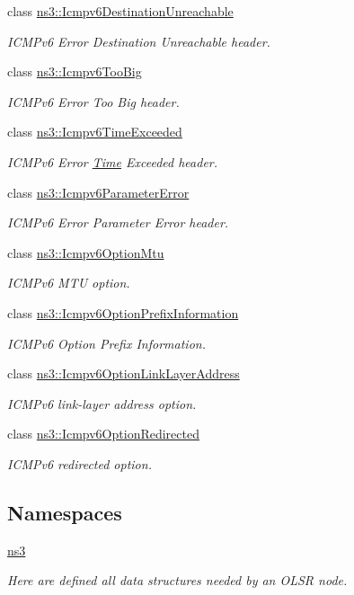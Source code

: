 \begin{DoxyCompactItemize}
class \hyperlink{classns3_1_1Icmpv6DestinationUnreachable}{ns3\+::\+Icmpv6\+Destination\+Unreachable}
\begin{DoxyCompactList}\small\item\em I\+C\+M\+Pv6 Error Destination Unreachable header. \end{DoxyCompactList}\item 
class \hyperlink{classns3_1_1Icmpv6TooBig}{ns3\+::\+Icmpv6\+Too\+Big}
\begin{DoxyCompactList}\small\item\em I\+C\+M\+Pv6 Error Too Big header. \end{DoxyCompactList}\item 
class \hyperlink{classns3_1_1Icmpv6TimeExceeded}{ns3\+::\+Icmpv6\+Time\+Exceeded}
\begin{DoxyCompactList}\small\item\em I\+C\+M\+Pv6 Error \hyperlink{classns3_1_1Time}{Time} Exceeded header. \end{DoxyCompactList}\item 
class \hyperlink{classns3_1_1Icmpv6ParameterError}{ns3\+::\+Icmpv6\+Parameter\+Error}
\begin{DoxyCompactList}\small\item\em I\+C\+M\+Pv6 Error Parameter Error header. \end{DoxyCompactList}\item 
class \hyperlink{classns3_1_1Icmpv6OptionMtu}{ns3\+::\+Icmpv6\+Option\+Mtu}
\begin{DoxyCompactList}\small\item\em I\+C\+M\+Pv6 M\+TU option. \end{DoxyCompactList}\item 
class \hyperlink{classns3_1_1Icmpv6OptionPrefixInformation}{ns3\+::\+Icmpv6\+Option\+Prefix\+Information}
\begin{DoxyCompactList}\small\item\em I\+C\+M\+Pv6 Option Prefix Information. \end{DoxyCompactList}\item 
class \hyperlink{classns3_1_1Icmpv6OptionLinkLayerAddress}{ns3\+::\+Icmpv6\+Option\+Link\+Layer\+Address}
\begin{DoxyCompactList}\small\item\em I\+C\+M\+Pv6 link-\/layer address option. \end{DoxyCompactList}\item 
class \hyperlink{classns3_1_1Icmpv6OptionRedirected}{ns3\+::\+Icmpv6\+Option\+Redirected}
\begin{DoxyCompactList}\small\item\em I\+C\+M\+Pv6 redirected option. \end{DoxyCompactList}\end{DoxyCompactItemize}
\subsection*{Namespaces}
\begin{DoxyCompactItemize}
\item 
 \hyperlink{namespacens3}{ns3}
\begin{DoxyCompactList}\small\item\em Here are defined all data structures needed by an O\+L\+SR node. \end{DoxyCompactList}\end{DoxyCompactItemize}
